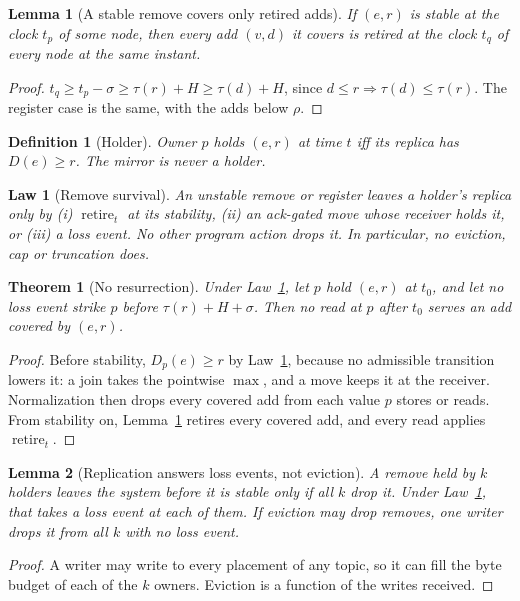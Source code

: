 \documentclass[journal]{IEEEtran}
\newtheorem{definition}{Definition}
\newtheorem{lemma}{Lemma}
\newtheorem{law}{Law}
\newtheorem{theorem}{Theorem}
\newcommand{\ret}{\operatorname{retire}}
\begin{document}
\begin{lemma}[A stable remove covers only retired adds]\label{lem:covers}
If $(e,r)$ is stable at the clock $t_p$ of some node, then every add $(v,d)$ it covers is
retired at the clock $t_q$ of every node at the same instant.
\end{lemma}
\begin{proof}
$t_q\ge t_p-\sigma\ge\tau(r)+H\ge\tau(d)+H$, since $d\le r\Rightarrow\tau(d)\le\tau(r)$.
The register case is the same, with the adds below $\rho$.
\end{proof}

\begin{definition}[Holder]\label{def:holder}
Owner $p$ \emph{holds} $(e,r)$ at time $t$ iff its replica has $D(e)\ge r$.  The mirror is
never a holder.
\end{definition}

\begin{law}[Remove survival]\label{law:survival}
An unstable remove or register leaves a holder's replica only by
(i) $\ret_t$ at its stability,
(ii) an ack-gated move whose receiver holds it, or
(iii) a loss event.
No other program action drops it.  In particular, no eviction, cap or truncation does.
\end{law}

\begin{theorem}[No resurrection]\label{theorem:noresurrect}
Under Law~\ref{law:survival}, let $p$ hold $(e,r)$ at $t_0$, and let no loss event strike
$p$ before $\tau(r)+H+\sigma$.  Then no read at $p$ after $t_0$ serves an add covered by
$(e,r)$.
\end{theorem}
\begin{proof}
Before stability, $D_p(e)\ge r$ by Law~\ref{law:survival}, because no admissible transition
lowers it: a join takes the pointwise $\max$, and a move keeps it at the receiver.
Normalization then drops every covered add from each value $p$ stores or reads.  From
stability on, Lemma~\ref{lem:covers} retires every covered add, and every read applies
$\ret_t$.
\end{proof}

\begin{lemma}[Replication answers loss events, not eviction]\label{lem:replication}
A remove held by $k$ holders leaves the system before it is stable only if all $k$ drop it.
Under Law~\ref{law:survival}, that takes a loss event at each of them.  If eviction may drop
removes, one writer drops it from all $k$ with no loss event.
\end{lemma}
\begin{proof}
A writer may write to every placement of any topic, so it can fill the byte budget of each
of the $k$ owners.  Eviction is a function of the writes received.
\end{proof}
\end{document}
